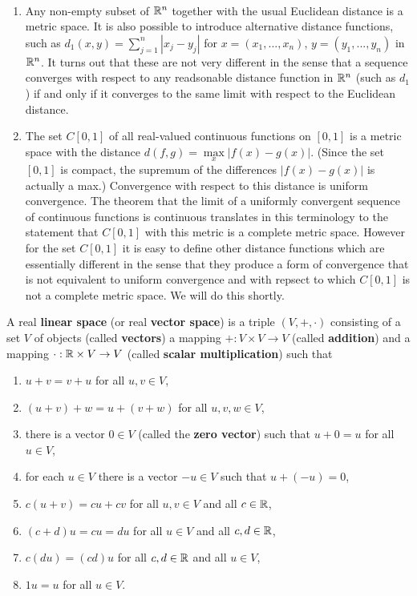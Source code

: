 \begin{ex}~%
	\begin{enumerate}
	\item Any non-empty subset of $\mathbb{R}^n$ together with the usual Euclidean distance 
		is a metric space. It is also possible to introduce alternative distance 
		functions, such as $d_1(x,y) = \sum\limits_{j=1}^n|x_j-y_j|$ for 
		$x=(x_1,...,x_n)$, $y=(y_1,...,y_n)$ in $\mathbb{R}^n$. It turns out that these 
		are not very different in the sense that a sequence converges with respect 
		to any readsonable distance function in $\mathbb{R}^n$ (such as $d_1$) if and only 
		if it converges to the same limit with respect to the Euclidean distance.
	\item The set $C[0,1]$ of all real-valued continuous functions on $[0,1]$ is a 
		metric space with the distance $d(f,g) = \max\limits_{x}|f(x)-g(x)|$. 
		(Since the set $[0,1]$ is compact, the supremum of the differences 
		$|f(x)-g(x)|$ is actually a max.) Convergence with respect to this distance 
		is uniform convergence. The theorem that the limit of a uniformly convergent 
		sequence of continuous functions is continuous translates in this terminology 
		to the statement that $C[0,1]$ with this metric is a complete metric space. 
		However for the set $C[0,1]$ it is easy to define other distance functions 
		which are essentially different in the sense that they produce a form of 
		convergence that is not equivalent to uniform convergence and with repsect to 
		which $C[0,1]$ is not a complete metric space. We will do this shortly. 
	\end{enumerate}
\end{ex}

\begin{defn} %
	A real \textbf{linear space} (or real \textbf{vector space}) is a triple 
	$(V,+,\cdot)$ consisting of a set $V$ of objects (called \textbf{vectors}) a 
	mapping $+:V\times V\rightarrow V$ (called \textbf{addition}) and a mapping 
	$\cdot : \mathbb{R} \times V \rightarrow V$ (called \textbf{scalar multiplication}) 
	such that 
	\begin{enumerate}
	\item $u + v = v + u$ for all $u, v \in V$, 
	\item $(u + v) + w = u + (v + w)$ for all $u, v, w \in V$, 
	\item there is a vector $0 \in V$ (called the \textbf{zero vector}) such that 
		$u + 0 = u$ for all $u \in V$,
	\item for each $u \in V$ there is a vector $-u \in V$ such that $u + (-u) = 0$, 
	\item $c(u + v) = cu + cv$ for all $u, v \in V$ and all $c \in \mathbb{R}$, 
	\item $(c + d)u = cu = du$ for all $u \in V$ and all $c, d\in \mathbb{R}$,  
	\item $c(du) = (cd)u$ for all $c, d \in \mathbb{R}$ and all $u \in V$, 
	\item $1u = u$ for all $u \in V$. 
	\end{enumerate}
\end{defn}

